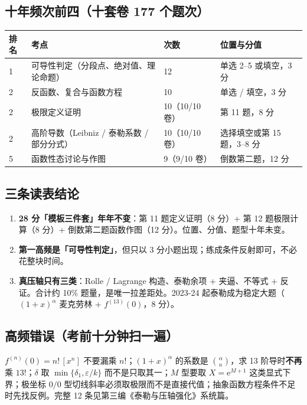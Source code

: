 \documentclass[11pt,a4paper]{ctexart}
\newcommand{\ee}{\mathrm{e}}
\newcommand{\eps}{\varepsilon}
\newcommand{\key}[1]{\textbf{#1}}
\begin{document}
\subsection{十年频次前四（十套卷 177 个题次）}
\begin{longtable}{@{}p{1.0cm}p{6.4cm}p{2.4cm}p{5.2cm}@{}}
\toprule
\textbf{排名} & \textbf{考点} & \textbf{次数} & \textbf{位置与分值} \\
\midrule
1 & 可导性判定（分段点、绝对值、理论命题） & 12 & 单选 2--5 或填空，3 分 \\
2 & 反函数、复合与函数方程 & 10 & 单选 / 填空，3 分 \\
2 & 极限定义证明 & 10（10/10 卷） & 第 11 题，8 分 \\
2 & 高阶导数（Leibniz / 泰勒系数 / 部分分式） & 10（10/10 卷） & 选择填空或第 15 题，3--8 分 \\
5 & 函数性态讨论与作图 & 9（9/10 卷） & 倒数第二题，12 分 \\
\bottomrule
\end{longtable}

\subsection{三条读表结论}
\begin{enumerate}
\item \key{28 分「模板三件套」年年不变}：第 11 题定义证明（8 分）+ 第 12 题极限计算（8 分）+ 倒数第二题函数作图（12 分）。位置、分值、题型十年未变。
\item \key{第一高频是「可导性判定」}，但只以 3 分小题出现；练成条件反射即可，不必花整块时间。
\item \key{真压轴只有三类}：Rolle / Lagrange 构造、泰勒余项 + 夹逼、不等式 + 反证。合计约 10\% 题量，是唯一拉差距处。2023-24 起泰勒成为稳定大题（$(1+x)^\alpha$ 麦克劳林 + $f^{(13)}(0)$，8 分）。
\end{enumerate}

\subsection{高频错误（考前十分钟扫一遍）}
$f^{(n)}(0)=n!\,[x^n]$ 不要漏乘 $n!$；$(1+x)^\alpha$ 的系数是 $\binom{\alpha}{n}$，求 13 阶导时\textbf{不再}乘 $13!$；$\delta$ 取 $\min\{\delta_1,\eps/k\}$ 而不是只取其一；$M$ 型要取 $X=\ee^{M+1}$ 这类显式下界；极坐标 $0/0$ 型切线斜率必须取极限而不是直接代值；抽象函数方程条件不足时先找反例。完整 12 条见第三编《泰勒与压轴强化》系统篇。

\newpage
\end{document}
